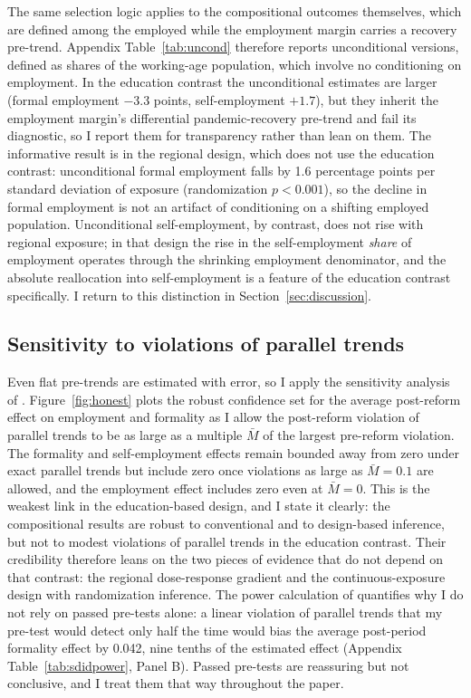 The same selection logic applies to the compositional outcomes themselves, which
are defined among the employed while the employment margin carries a recovery
pre-trend. Appendix Table~\ref{tab:uncond} therefore reports unconditional
versions, defined as shares of the working-age population, which involve no
conditioning on employment. In the education contrast the unconditional estimates
are larger (formal employment $-3.3$ points, self-employment $+1.7$), but they
inherit the employment margin's differential pandemic-recovery pre-trend and fail
its diagnostic, so I report them for transparency rather than lean on them. The
informative result is in the regional design, which does not use the education
contrast: unconditional formal employment falls by 1.6 percentage points per
standard deviation of exposure (randomization $p<0.001$), so the decline in formal
employment is not an artifact of conditioning on a shifting employed population.
Unconditional self-employment, by contrast, does not rise with regional exposure;
in that design the rise in the self-employment \emph{share} of employment operates
through the shrinking employment denominator, and the absolute reallocation into
self-employment is a feature of the education contrast specifically. I return to
this distinction in Section~\ref{sec:discussion}.

\subsection{Sensitivity to violations of parallel trends}

Even flat pre-trends are estimated with error, so I apply the sensitivity analysis of
\citet{rambachan_roth_2023}. Figure~\ref{fig:honest} plots the robust confidence set for
the average post-reform effect on employment and formality as I allow the post-reform
violation of parallel trends to be as large as a multiple $\bar{M}$ of the largest
pre-reform violation. The formality and self-employment effects remain bounded away from
zero under exact parallel trends but include zero once violations as large as
$\bar{M}=0.1$ are allowed, and the employment effect includes zero even at
$\bar{M}=0$. This is the weakest link in the education-based design, and I state it
clearly: the compositional results are robust to conventional and to design-based
inference, but not to modest violations of parallel trends in the education contrast.
Their credibility therefore leans on the two pieces of evidence that do not depend on
that contrast: the regional dose-response gradient and the continuous-exposure design
with randomization inference. The power calculation of \citet{roth_2022_pretest}
quantifies why I do not rely on passed pre-tests alone: a linear violation of
parallel trends that my pre-test would detect only half the time would bias the average
post-period formality effect by 0.042, nine tenths of the estimated effect
(Appendix Table~\ref{tab:sdidpower}, Panel B). Passed pre-tests are reassuring but not
conclusive, and I treat them that way throughout the paper.

